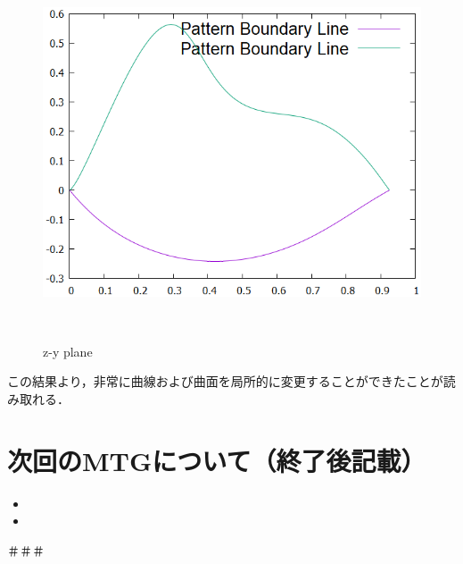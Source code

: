 \documentclass[16.7pt]{jsarticle}
\begin{document}
　  	\begin{figure}[H]
　   		\centering
　   		\includegraphics[width = 0.4\columnwidth]{figure/0409/Patt2.png}
　   		\caption{z-y plane }
　   \end{figure}
	この結果より，非常に曲線および曲面を局所的に変更することができたことが読み取れる．
		
	\section{次回のMTGについて（終了後記載）}
	\begin{itemize}
		\item  
		\item 
	\end{itemize}
	＃＃＃
	\newpage
	

\end{document}
